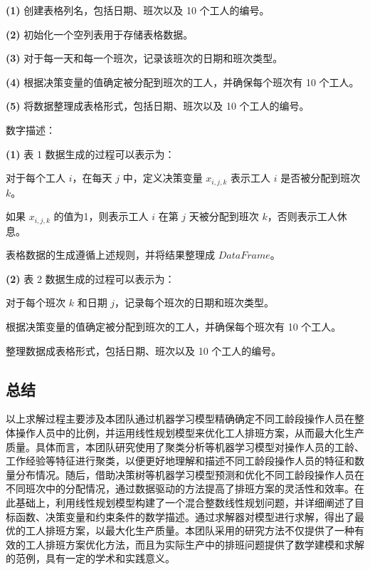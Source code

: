 \documentclass[withoutpreface,bwprint]{cumcmthesis}
\begin{document}
\textbf{(1)} 创建表格列名，包括日期、班次以及 10 个工人的编号。

\textbf{(2)} 初始化一个空列表用于存储表格数据。

\textbf{(3)} 对于每一天和每一个班次，记录该班次的日期和班次类型。

\textbf{(4)} 根据决策变量的值确定被分配到班次的工人，并确保每个班次有 10 个工人。

\textbf{(5)} 将数据整理成表格形式，包括日期、班次以及 10 个工人的编号。

\vspace{12pt}
数字描述：

\textbf{(1)} 表 1 数据生成的过程可以表示为：

对于每个工人 \( i \)，在每天 \( j \) 中，定义决策变量 \( x_{i,j,k} \) 表示工人 \( i \) 是否被分配到班次 \( k \)。

如果 \( x_{i,j,k} \) 的值为1，则表示工人 \( i \) 在第 \( j \) 天被分配到班次 \( k \)，否则表示工人休息。

表格数据的生成遵循上述规则，并将结果整理成 \(DataFrame\)。

\textbf{(2)} 表 2 数据生成的过程可以表示为：

对于每个班次 \( k \) 和日期 \( j \)，记录每个班次的日期和班次类型。

根据决策变量的值确定被分配到班次的工人，并确保每个班次有 10 个工人。

整理数据成表格形式，包括日期、班次以及 10 个工人的编号。

\subsection{总结}

以上求解过程主要涉及本团队通过机器学习模型精确确定不同工龄段操作人员在整体操作人员中的比例，并运用线性规划模型来优化工人排班方案，从而最大化生产质量。具体而言，本团队研究使用了聚类分析等机器学习模型对操作人员的工龄、工作经验等特征进行聚类，以便更好地理解和描述不同工龄段操作人员的特征和数量分布情况。随后，借助决策树等机器学习模型预测和优化不同工龄段操作人员在不同班次中的分配情况，通过数据驱动的方法提高了排班方案的灵活性和效率。在此基础上，利用线性规划模型构建了一个混合整数线性规划问题，并详细阐述了目标函数、决策变量和约束条件的数学描述。通过求解器对模型进行求解，得出了最优的工人排班方案，以最大化生产质量。本团队采用的研究方法不仅提供了一种有效的工人排班方案优化方法，而且为实际生产中的排班问题提供了数学建模和求解的范例，具有一定的学术和实践意义。

\end{document}
